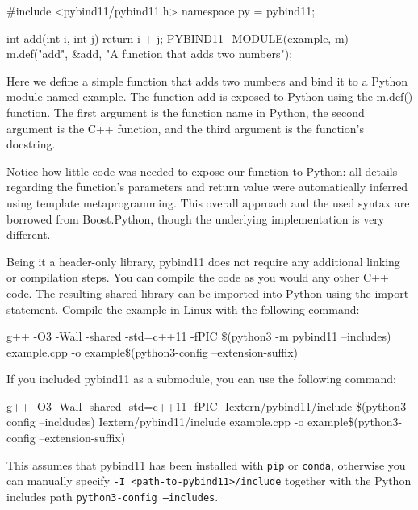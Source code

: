 \begin{codeblock}[language=C++]
#include <pybind11/pybind11.h>
namespace py = pybind11;

int add(int i, int j) {
    return i + j;
}
PYBIND11_MODULE(example, m) {
    m.def("add", &add, "A function that adds two numbers");
}
\end{codeblock}

Here we define a simple function that adds two numbers and bind it to a Python module named example. The function add is exposed to Python using the m.def() function. The first argument is the function name in Python, the second argument is the C++ function, and the third argument is the function's docstring.

\begin{observationblock}[pybind11]
    Notice how little code was needed to expose our function to Python: all details regarding the
    function's parameters and return value were automatically inferred using template
    metaprogramming. This overall approach and the used syntax are borrowed from Boost.Python,
    though the underlying implementation is very different.
\end{observationblock}

Being it a header-only library, pybind11 does not require any additional linking or compilation steps. You can compile the code as you would any other C++ code. The resulting shared library can be imported into Python using the import statement.
Compile the example in Linux with the following command:

\begin{codeblock}[language = bash]
g++ -O3 -Wall -shared -std=c++11 -fPIC 
\$(python3 -m pybind11 --includes)
example.cpp -o example\$(python3-config --extension-suffix)
\end{codeblock}

If you included pybind11 as a submodule, you can use the following command: 

\begin{codeblock}[language = bash]
g++ -O3 -Wall -shared -std=c++11 -fPIC 
-Iextern/pybind11/include 
\$(python3-config --incldudes) Iextern/pybind11/include
example.cpp -o example\$(python3-config --extension-suffix)
\end{codeblock}

This assumes that pybind11 has been installed with \texttt{pip} or \texttt{conda}, otherwise you can manually specify
\texttt{-I <path-to-pybind11>/include} together with the Python includes path \texttt{python3-config --includes}.


